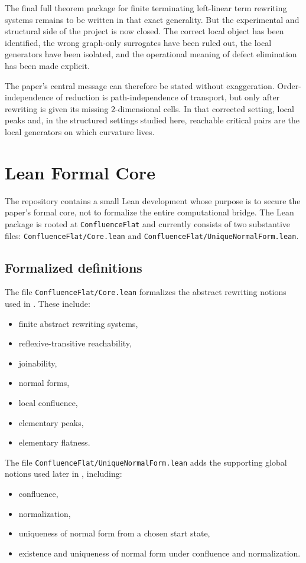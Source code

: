 \documentclass[11pt]{article}
\numberwithin{equation}{section}
\newcommand{\code}[1]{\nolinkurl{#1}}
\theoremstyle{definition}
\theoremstyle{remark}
\begin{document}
The final full theorem package for finite terminating left-linear term rewriting systems remains to be written in that exact generality. But the experimental and structural side of the project is now closed. The correct local object has been identified, the wrong graph-only surrogates have been ruled out, the local generators have been isolated, and the operational meaning of defect elimination has been made explicit.

The paper's central message can therefore be stated without exaggeration. Order-independence of reduction is path-independence of transport, but only after rewriting is given its missing $2$-dimensional cells. In that corrected setting, local peaks and, in the structured settings studied here, reachable critical pairs are the local generators on which curvature lives.
 
\appendix

\section{Lean Formal Core}
\label{app:lean-formal-core}

The repository contains a small Lean development whose purpose is to secure the paper's formal core, not to formalize the entire computational bridge. The Lean package is rooted at \texttt{ConfluenceFlat} and currently consists of two substantive files: \code{ConfluenceFlat/Core.lean} and \code{ConfluenceFlat/UniqueNormalForm.lean}.

\subsection{Formalized definitions}

The file \code{ConfluenceFlat/Core.lean} formalizes the abstract rewriting notions used in . These include:
\begin{itemize}
    \item finite abstract rewriting systems,
    \item reflexive-transitive reachability,
    \item joinability,
    \item normal forms,
    \item local confluence,
    \item elementary peaks,
    \item elementary flatness.
\end{itemize}

The file \code{ConfluenceFlat/UniqueNormalForm.lean} adds the supporting global notions used later in , including:
\begin{itemize}
    \item confluence,
    \item normalization,
    \item uniqueness of normal form from a chosen start state,
    \item existence and uniqueness of normal form under confluence and normalization.
\end{itemize}
\end{document}
